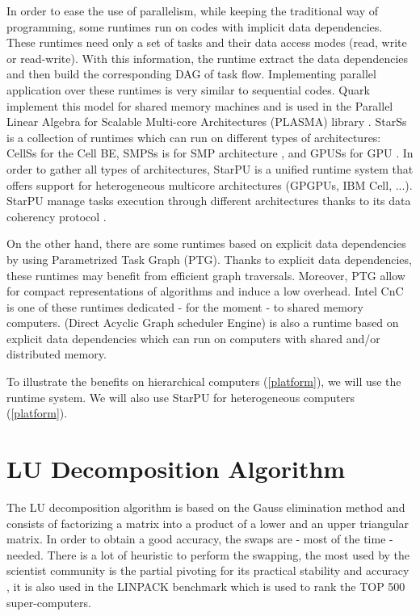 In order to ease the use of parallelism, while keeping the traditional way of programming, some runtimes run on codes with implicit data dependencies. These runtimes need only a set of tasks and their data access modes (read, write or read-write). With this information, the runtime extract the data dependencies and then build the corresponding DAG of task flow. Implementing parallel application over these runtimes is very similar to sequential codes. Quark implement this model for shared memory machines and is used in the Parallel Linear Algebra for Scalable Multi-core Architectures (PLASMA) library \cite{1742-6596-180-1-012037}.
StarSs is a collection of runtimes which can run on different types of architectures: CellSs for the Cell BE\cite{Bellens06}, SMPSs is for SMP architecture \cite{journals/concurrency/BadiaHLPQQ09}, and GPUSs for GPU \cite{Ayguade09}. In order to gather all types of architectures, StarPU is a unified runtime system that offers support for heterogeneous multicore architectures (GPGPUs, IBM Cell, ...). StarPU manage tasks execution through different architectures thanks to its data coherency protocol \cite{DoBiBo07,journals/concurrency/AugonnetTNW11}.


On the other hand, there are some runtimes based on explicit data dependencies by using Parametrized Task Graph (PTG).
Thanks to explicit data dependencies, these runtimes may benefit from efficient graph traversals. Moreover, PTG allow for compact representations of algorithms and induce a low overhead. Intel CnC is one of these runtimes dedicated - for the moment - to shared memory computers. \dague (Direct Acyclic Graph scheduler Engine) is also a runtime based on explicit data dependencies which can run on computers with shared and/or distributed memory.

To illustrate the benefits on hierarchical computers (\ref{platform}), we will use the \dague runtime system. We will also use StarPU for heterogeneous computers (\ref{platform}).

\section{LU Decomposition Algorithm}\label{lu_algo}
The LU decomposition algorithm is based on the Gauss elimination method and consists of factorizing a matrix into a product of a lower and an upper triangular matrix. In order to obtain a good accuracy, the swaps are - most of the time - needed. There is a lot of heuristic to perform the swapping, the most used by the scientist community is the partial pivoting for its practical stability and accuracy \cite{Hig02}, it is also used in the LINPACK benchmark which is used to rank the TOP 500 super-computers.


